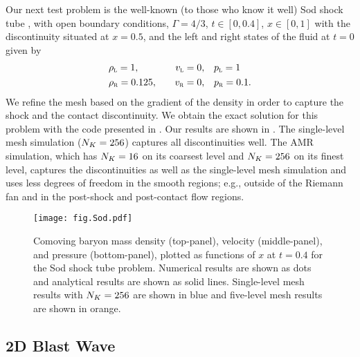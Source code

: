 Our next test problem is the well-known (to those who know it well)
Sod shock tube \citep{s1978},
with open boundary conditions,
$\Gamma=4/3$,
$t\in\left[0,0.4\right]$,
$x\in\left[0,1\right]$ with the discontinuity situated at $x=0.5$,
and the left and right states of the fluid at $t=0$ given by
\begin{alignat*}{3}
  &\rho_{\textsc{l}}=1,\hspace{1em}
  &v_{\textsc{l}}=0,\hspace{1em}
  &p_{\textsc{l}}=1 \\
  &\rho_{\textsc{r}}=0.125,\hspace{1em}
  &v_{\textsc{r}}=0,\hspace{1em}
  &p_{\textsc{r}}=0.1.
\end{alignat*}
We refine the mesh based on the gradient of the density in order to capture
the shock and the contact discontinuity.
We obtain the exact solution for this problem with the code presented
in \citet{mm2003}.
Our results are shown in .
The single-level mesh simulation ($N_{K}=256$) captures all discontinuities well.
The AMR simulation, which has $N_{K}=16$ on its coarsest level and $N_{K}=256$
on its finest level, captures the discontinuities as well as the single-level
mesh simulation and uses less degrees of freedom in the smooth regions; e.g.,
outside of the Riemann fan and in the post-shock and post-contact flow regions.
\begin{figure}[htb!]
  \centering
  \texttt{[image: fig.Sod.pdf]}
  \caption{
Comoving baryon mass density (top-panel),
velocity (middle-panel),
and pressure (bottom-panel),
plotted as functions of $x$ at $t=0.4$ for the Sod shock tube problem.
Numerical results are shown as dots and
analytical results are shown as solid lines.
Single-level mesh results with $N_{K}=256$ are shown in blue
and five-level mesh results are shown in orange.}
  \label{fig.Sod}
\end{figure}

\subsection{2D Blast Wave}

